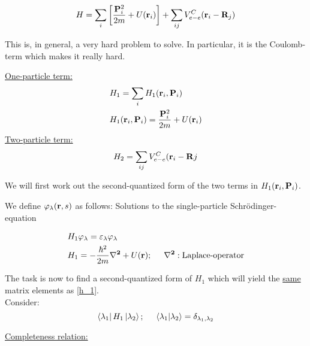 \begin{equation}
	H = \sum_i \left[\frac{\vb{P}_i^2}{2m} + U(\vb{r}_i)  \right]+ \sum_{ij} V_{e-e}^C (\vb{r}_i-\vb{R}_j)
\end{equation}

\noindent This is, in general, a very hard problem to solve. In particular, it is the Coulomb-term which makes it really hard.\\
\linebreak

\noindent\uline{One-particle term:}
\begin{align}
	&H_1 = \sum_i H_1 (\vb{r}_i, \vb{P}_i)\\
	&H_1 (\vb{r}_i, \vb{P}_i) = \frac{\vb{P}_i^2}{2m} + U(\vb{r}_i)
\end{align}
\linebreak
\noindent \uline{Two-particle term:}
\begin{equation}
	H_2 = \sum_{ij} V_{e-e}^C (\vb{r}_i-\vb{R}j
\end{equation}

\noindent We will first work out the second-quantized form of the two terms in $H_1 (\vb{r}_i, \vb{P}_i)$. \\
\linebreak

\noindent We define $\varphi_\lambda ( \vb{r},s)$ as follows:
Solutions to the single-particle Schrödinger-equation

\begin{align}
	&H_1 \varphi_\lambda = \varepsilon_\lambda \varphi_\lambda\\
	&H_1 = -\frac{\hbar^2}{2m} \vb{\laplacian} + U(\vb{r}) ; \hspace{0.5cm} \vb{\laplacian} : \text{Laplace-operator} \label{h_1}
\end{align}

\noindent The task is now to find a second-quantized form of $H_1$ which will yield the \uline{same} matrix elements as \ref{h_1}.\\
\linebreak
\noindent Consider:
\begin{equation}
	\bra{\lambda_1} H_1 \ket{\lambda_2} ; \hspace{0.5cm} \braket{\lambda_1}{\lambda_2} = \delta_{\lambda_1, \lambda_2}
\end{equation}

\noindent \uline{Completeness relation:}

